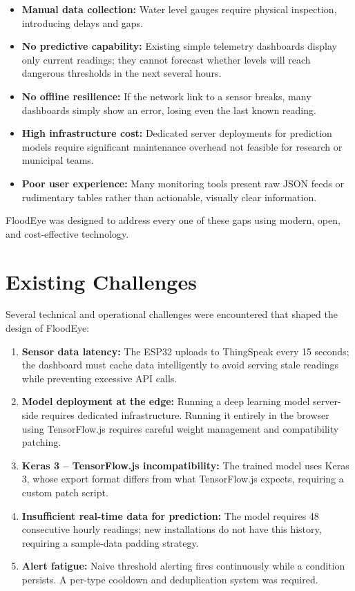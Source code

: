 \begin{itemize}[leftmargin=1.5em]
  \item \textbf{Manual data collection:} Water level gauges require physical inspection, introducing delays and gaps.
  \item \textbf{No predictive capability:} Existing simple telemetry dashboards display only current readings; they cannot forecast whether levels will reach dangerous thresholds in the next several hours.
  \item \textbf{No offline resilience:} If the network link to a sensor breaks, many dashboards simply show an error, losing even the last known reading.
  \item \textbf{High infrastructure cost:} Dedicated server deployments for prediction models require significant maintenance overhead not feasible for research or municipal teams.
  \item \textbf{Poor user experience:} Many monitoring tools present raw JSON feeds or rudimentary tables rather than actionable, visually clear information.
\end{itemize}

FloodEye was designed to address every one of these gaps using modern, open, and cost-effective technology.

\section{Existing Challenges}

Several technical and operational challenges were encountered that shaped the design of FloodEye:

\begin{enumerate}[leftmargin=1.5em]
  \item \textbf{Sensor data latency:} The ESP32 uploads to ThingSpeak every 15 seconds; the dashboard must cache data intelligently to avoid serving stale readings while preventing excessive API calls.
  \item \textbf{Model deployment at the edge:} Running a deep learning model server-side requires dedicated infrastructure. Running it entirely in the browser using TensorFlow.js requires careful weight management and compatibility patching.
  \item \textbf{Keras 3 -- TensorFlow.js incompatibility:} The trained model uses Keras 3, whose export format differs from what TensorFlow.js expects, requiring a custom patch script.
  \item \textbf{Insufficient real-time data for prediction:} The model requires 48 consecutive hourly readings; new installations do not have this history, requiring a sample-data padding strategy.
  \item \textbf{Alert fatigue:} Naive threshold alerting fires continuously while a condition persists. A per-type cooldown and deduplication system was required.
\end{enumerate}

